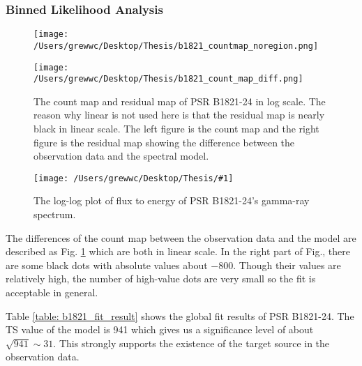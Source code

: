\documentclass[12pt]{report}
\newcommand{\singleFig}[3]{
  \begin{figure}[!ht]
    \centering
    \texttt{[image: /Users/grewwc/Desktop/Thesis/\#1]}
    \caption{#3}
    \label{fig: #1}
  \end{figure}
}
\begin{document}
              \subsubsection{Binned Likelihood Analysis}
              \begin{figure}[!ht]
                \begin{center}
                \begin{minipage}{0.45\textwidth}
                  \begin{center} 
                    \texttt{[image: /Users/grewwc/Desktop/Thesis/b1821\_countmap\_noregion.png]}
                  \end{center}
                \end{minipage}
                \begin{minipage}{0.45\textwidth}
                  \begin{center}
                    \texttt{[image: /Users/grewwc/Desktop/Thesis/b1821\_count\_map\_diff.png]}
                  \end{center}
                \end{minipage}
              \end{center}
              \caption{The count map and residual map of PSR B1821-24 in log scale. 
              The reason why linear is not used here is that the residual map is nearly black in linear scale.
              The \textsf{left} figure is the count map and the \textsf{right} 
              figure is the residual map showing the difference between the observation data and the spectral model.}
              \label{fig: b1821_count_map_diff.png}
            \end{figure}

            \singleFig{b1821_cur.png}{0.40}{The log-log plot of flux to energy of 
              PSR B1821-24's gamma-ray spectrum.}
              \vspace{1cm}

            The differences of the count map between the observation data and the model are described as Fig. 
            \ref{fig: b1821_count_map_diff.png} which are both in linear scale. In the right part of Fig., 
            there are some black dots 
            with absolute values about $-800$. Though their values are relatively high, the number of 
            high-value dots are very small so the fit is acceptable in general. 

            Table \ref{table: b1821_fit_result} shows the global fit results of PSR B1821-24. 
            The TS value of the model is 941 which gives us a significance level 
            of about $\sqrt{941} \sim 31$. This strongly supports the existence of the target source in 
            the observation data.
\end{document}
